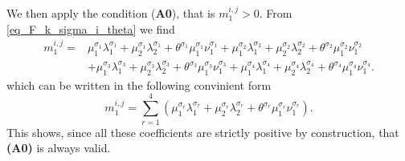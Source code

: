 \documentclass[final,11pt]{elsarticle}
\begin{document}
We then apply the condition (\textbf{A0}), that is $m_{1}^{i,j}>0$.
From \eqref{eq_F_k_sigma_i_theta} we find
\begin{equation}\label{formula:m1}
\begin{aligned}
m_1^{i,j}={}&
    \mu_1^{\sigma_1}\lambda_1^{\sigma_1}+\mu_2^{\sigma_1}\lambda_2^{\sigma_1}+\theta^{\sigma_1}\mu_1^{\sigma_1}\nu_1^{\sigma_1}+\mu_1^{\sigma_2}\lambda_1^{\sigma_2}+\mu_2^{\sigma_2}\lambda_2^{\sigma_2}+\theta^{\sigma_2}\mu_1^{\sigma_2}\nu_1^{\sigma_2}\\
    &+\mu_1^{\sigma_3}\lambda_1^{\sigma_3}+\mu_2^{\sigma_3}\lambda_2^{\sigma_3}+\theta^{\sigma_3}\mu_1^{\sigma_3}\nu_1^{\sigma_3}+\mu_1^{\sigma_4}\lambda_1^{\sigma_4}+\mu_2^{\sigma_4}\lambda_2^{\sigma_4}+\theta^{\sigma_4}\mu_1^{\sigma_4}\nu_1^{\sigma_4}.
\end{aligned}
\end{equation}
which can be written in the following convinient form
\[m_1^{i,j}=\sum_{r=1}^4 \left(\mu_1^{\sigma_r}\lambda_1^{\sigma_r}+\mu_2^{\sigma_r}\lambda_2^{\sigma_r}+\theta^{\sigma_r}\mu_1^{\sigma_r}\nu_1^{\sigma_r}\right).\]
This shows, since all these coefficients are strictly positive by construction, that \textbf{(A0)} is always valid.
\end{document}
